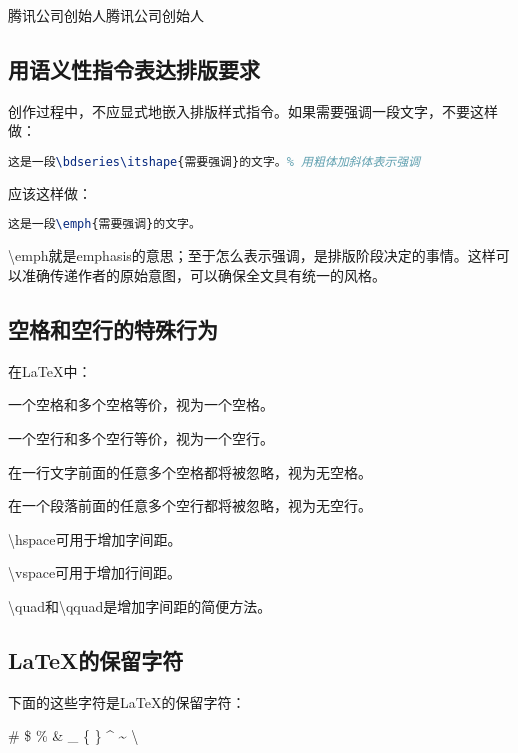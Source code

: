 腾讯公司创始人腾讯公司创始人
\endgroup

\subsection{用语义性指令表达排版要求}
\label{subsec:semantics}

创作过程中，不应显式地嵌入排版样式指令。如果需要强调一段文字，不要这样做：

\begin{lstlisting}[language=TeX]
这是一段\bdseries\itshape{需要强调}的文字。% 用粗体加斜体表示强调
\end{lstlisting}

应该这样做：

\begin{lstlisting}[language=TeX]
这是一段\emph{需要强调}的文字。
\end{lstlisting}

\textbackslash{}emph就是emphasis的意思；至于怎么表示强调，是排版阶段决定的事情。这样可以准确传递作者的原始意图，可以确保全文具有统一的风格。

\subsection{空格和空行的特殊行为}

在\LaTeX{}中：

\begin{Itemize}
\item {一个空格和多个空格等价，视为一个空格。}
\item {一个空行和多个空行等价，视为一个空行。}
\item {在一行文字前面的任意多个空格都将被忽略，视为无空格。}
\item {在一个段落前面的任意多个空行都将被忽略，视为无空行。}
\item {\textbackslash{}hspace可用于增加字间距。}
\item {\textbackslash{}vspace可用于增加行间距。}
\item {\textbackslash{}quad和\textbackslash{}qquad是增加字间距的简便方法。}
\end{Itemize}

\subsection{\LaTeX{}的保留字符}

下面的这些字符是\LaTeX{}的保留字符：

\# \qquad \$ \qquad \% \qquad \& \qquad \_ \qquad \{ \qquad \} \qquad \textasciicircum{} \qquad \textasciitilde{} \qquad \textbackslash{}

